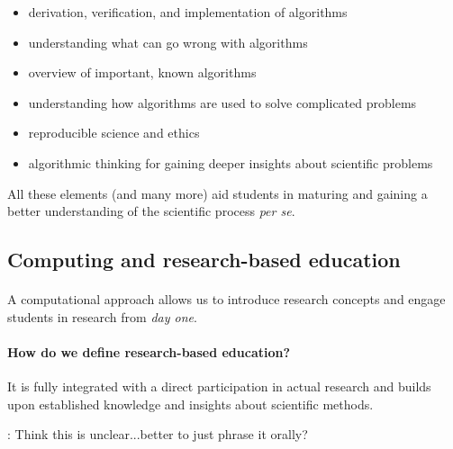 \documentclass[%
<<<<<<< HEAD
<<<<<<< HEAD
oneside,                 %
final,                   %
=======
twoside,                 %
final,                   %
>>>>>>> 5fc06d357468ca5ec59d2d3ed0179709275f8f00
=======
oneside,                 %
final,                   %
>>>>>>> master
10pt]{article}
\newcommand{\shortinlinecomment}[3]{{\color{red}{\bf #1}: #2}}
\begin{document}
\begin{itemize}
\item derivation, verification, and implementation of algorithms

\item understanding what can go wrong with algorithms

\item overview of important, known algorithms

\item understanding how algorithms are used to solve complicated problems

\item reproducible science and ethics

\item algorithmic thinking for gaining deeper insights about scientific problems
\end{itemize}

\noindent
All these elements (and many more) aid students in maturing and gaining a better understanding of the scientific process \emph{per se}.







\subsection*{Computing and research-based education}


\paragraph{}
A computational approach allows us to introduce research concepts and engage students in research from \emph{day one}.



\paragraph{How do we define research-based education?}
It is fully integrated with a direct participation in actual research and builds upon established
knowledge and insights about scientific methods.

\shortinlinecomment{hpl 1}{ Think this is unclear...better to just phrase it orally? }{ Think this is unclear...better }
\end{document}
